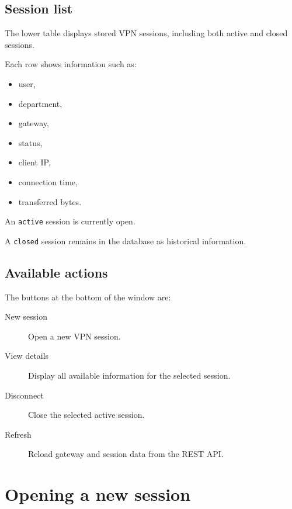 \documentclass[11pt,a4paper]{article}
\begin{document}
\subsection*{Session list}

The lower table displays stored VPN sessions, including both active and closed
sessions.

Each row shows information such as:

\begin{itemize}
    \item user,
    \item department,
    \item gateway,
    \item status,
    \item client IP,
    \item connection time,
    \item transferred bytes.
\end{itemize}

An \texttt{active} session is currently open.

A \texttt{closed} session remains in the database as historical information.

\subsection*{Available actions}

The buttons at the bottom of the window are:

\begin{description}
    \item[New session]
    Open a new VPN session.

    \item[View details]
    Display all available information for the selected session.

    \item[Disconnect]
    Close the selected active session.

    \item[Refresh]
    Reload gateway and session data from the REST API.
\end{description}

\section{Opening a new session}
\end{document}

